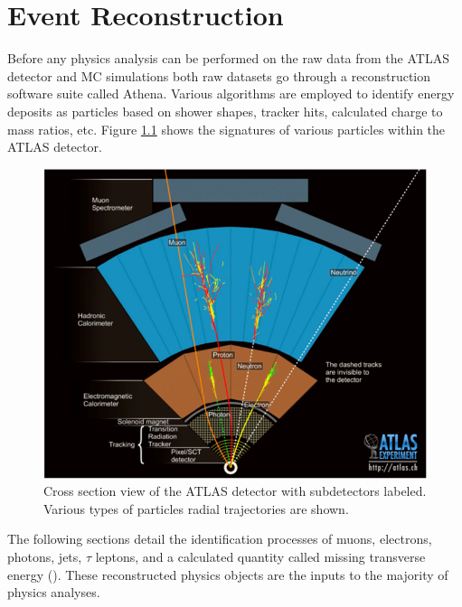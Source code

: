 \chapter{Event Reconstruction}\label{chap:reco}
	Before any physics analysis can be performed on the raw data from the ATLAS detector and MC simulations both raw datasets go through a reconstruction software suite called Athena. Various algorithms are employed to identify energy deposits as particles based on shower shapes, tracker hits, calculated charge to mass ratios, etc. Figure \ref{fig:ATLAS-XSec} shows the signatures of various particles within the ATLAS detector. 

	\begin{figure}[!ht]
	\centering
	\includegraphics[width=.65\textwidth,keepaspectratio=true]{chapters/chapter3_experiment/images/ATLASCrossSectionDiagram.png}
	\caption{ Cross section view of the ATLAS detector with subdetectors labeled. Various types of particles radial trajectories are shown.}
	\label{fig:ATLAS-XSec}
	\end{figure}

	The following sections detail the identification processes of muons, electrons, photons, jets, $\tau$ leptons, and a calculated quantity called missing transverse energy (\Etm). These reconstructed physics objects are the inputs to the majority of physics analyses.

